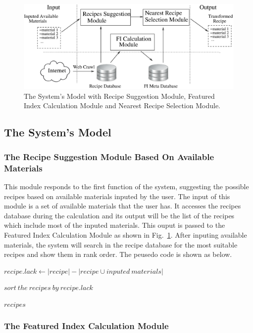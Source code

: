 \documentclass{sig-alternate}
\begin{document}
\begin{figure}[ht]
\centering
\includegraphics[scale=0.8]{system.eps} 
\caption{The System's Model with Recipe Suggestion Module, Featured Index Calculation Module and Nearest Recipe Selection Module.}
\label{fig:system-model}
\end{figure}

\subsection{The System's Model}

\subsubsection{The Recipe Suggestion Module Based On Available Materials}

This module responds to the first function of the system, suggesting the possible recipes based on available materials inputed by the user. The input of this module is a set of available materials that the user has. It accesses the recipes database during the calculation and its output will be the list of the recipes which include most of the inputed materials. This ouput is passed to the Featured Index Calculation Module as shown in Fig.~\ref{fig:system-model}. After inputing available materials, the system will search in the recipe database for the most suitable recipes and show them in rank order. The peusedo code is shown as below. 

\begin{algorithmic}

\State $recipe.lack \gets |recipe| - |recipe \cup inputed\ materials|$
\EndFor

\State $sort\ the\ recipes\ by\ recipe.lack$

\Return $recipes$

\end{algorithmic}


\subsubsection{The Featured Index Calculation Module}
\end{document}

